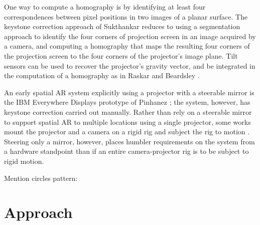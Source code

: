 \documentclass[review]{elsarticle}
\begin{document}
One way to compute a homography is by identifying at least four correspondences between pixel positions in two images of a planar surface. The keystone correction approach of Sukthankar \etal \cite{sukthankar2001smarter} reduces to using a segmentation approach to identify the four corners of projection screen in an image acquired by a camera, and computing a homography that maps the resulting four corners of the projection screen to the four corners of the projector's image plane. Tilt sensors can be used to recover the projector's gravity vector, and be integrated in the computation of a homography as in Raskar and Beardsley \cite{raskar2001self}.

An early spatial AR system explicitly using a projector with a steerable mirror is the IBM Everywhere Displays prototype of Pinhanez \cite{pinhanez2001everywhere}; the system, however, has keystone correction carried out manually. Rather than rely on a steerable mirror to support spatial AR to multiple locations using a single projector, some works mount the projector and a camera on a rigid rig and subject the rig to motion \cite{ehnes2004projected,borkowski2004spatial,butz2006applying}. Steering only a mirror, however, places humbler requirements on the system from a hardware standpoint than if an entire camera-projector rig is to be subject to rigid motion.

Mention circles pattern: \cite{chiu2011novel}



\section{Approach}
\end{document}
